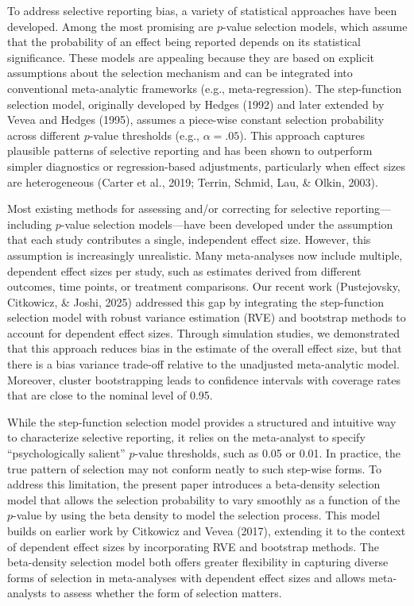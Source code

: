 \documentclass[
  american,
  man, donotrepeattitle,floatsintext]{apa7}
\begin{document}
To address selective reporting bias, a variety of statistical approaches have been developed. Among the most promising are \(p\)-value selection models, which assume that the probability of an effect being reported depends on its statistical significance. These models are appealing because they are based on explicit assumptions about the selection mechanism and can be integrated into conventional meta-analytic frameworks (e.g., meta-regression). The step-function selection model, originally developed by Hedges (1992) and later extended by Vevea and Hedges (1995), assumes a piece-wise constant selection probability across different \(p\)-value thresholds (e.g., \(\alpha = .05\)). This approach captures plausible patterns of selective reporting and has been shown to outperform simpler diagnostics or regression-based adjustments, particularly when effect sizes are heterogeneous (Carter et al., 2019; Terrin, Schmid, Lau, \& Olkin, 2003).

Most existing methods for assessing and/or correcting for selective reporting---including \(p\)-value selection models---have been developed under the assumption that each study contributes a single, independent effect size. However, this assumption is increasingly unrealistic. Many meta-analyses now include multiple, dependent effect sizes per study, such as estimates derived from different outcomes, time points, or treatment comparisons. Our recent work (Pustejovsky, Citkowicz, \& Joshi, 2025) addressed this gap by integrating the step-function selection model with robust variance estimation (RVE) and bootstrap methods to account for dependent effect sizes. Through simulation studies, we demonstrated that this approach reduces bias in the estimate of the overall effect size, but that there is a bias variance trade-off relative to the unadjusted meta-analytic model. Moreover, cluster bootstrapping leads to confidence intervals with coverage rates that are close to the nominal level of 0.95.

While the step-function selection model provides a structured and intuitive way to characterize selective reporting, it relies on the meta-analyst to specify ``psychologically salient'' \(p\)-value thresholds, such as 0.05 or 0.01. In practice, the true pattern of selection may not conform neatly to such step-wise forms. To address this limitation, the present paper introduces a beta-density selection model that allows the selection probability to vary smoothly as a function of the \(p\)-value by using the beta density to model the selection process. This model builds on earlier work by Citkowicz and Vevea (2017), extending it to the context of dependent effect sizes by incorporating RVE and bootstrap methods. The beta-density selection model both offers greater flexibility in capturing diverse forms of selection in meta-analyses with dependent effect sizes and allows meta-analysts to assess whether the form of selection matters.
\end{document}
